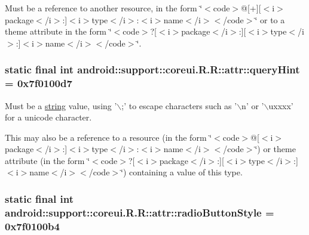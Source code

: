 Must be a reference to another resource, in the form \char`\"{}$<$code$>$@\mbox{[}+\mbox{]}\mbox{[}$<$i$>$package$<$/i$>$:\mbox{]}$<$i$>$type$<$/i$>$:$<$i$>$name$<$/i$>$$<$/code$>$\char`\"{} or to a theme attribute in the form \char`\"{}$<$code$>$?\mbox{[}$<$i$>$package$<$/i$>$:\mbox{]}\mbox{[}$<$i$>$type$<$/i$>$:\mbox{]}$<$i$>$name$<$/i$>$$<$/code$>$\char`\"{}. \hypertarget{classandroid_1_1support_1_1coreui_1_1_r_1_1attr_500b3e6d59de87b1352f0607ba444830}{
\subsubsection[{queryHint}]{\setlength{\rightskip}{0pt plus 5cm}static final int android::support::coreui.R.R::attr::queryHint = 0x7f0100d7}}
\label{classandroid_1_1support_1_1coreui_1_1_r_1_1attr_500b3e6d59de87b1352f0607ba444830}


Must be a \hyperlink{classandroid_1_1support_1_1coreui_1_1_r_1_1string}{string} value, using '$\backslash$;' to escape characters such as '$\backslash$n' or '$\backslash$uxxxx' for a unicode character. 

This may also be a reference to a resource (in the form \char`\"{}$<$code$>$@\mbox{[}$<$i$>$package$<$/i$>$:\mbox{]}$<$i$>$type$<$/i$>$:$<$i$>$name$<$/i$>$$<$/code$>$\char`\"{}) or theme attribute (in the form \char`\"{}$<$code$>$?\mbox{[}$<$i$>$package$<$/i$>$:\mbox{]}\mbox{[}$<$i$>$type$<$/i$>$:\mbox{]}$<$i$>$name$<$/i$>$$<$/code$>$\char`\"{}) containing a value of this type. \hypertarget{classandroid_1_1support_1_1coreui_1_1_r_1_1attr_2419de2fe2b9f1de9232cb340e4e58c1}{
\subsubsection[{radioButtonStyle}]{\setlength{\rightskip}{0pt plus 5cm}static final int android::support::coreui.R.R::attr::radioButtonStyle = 0x7f0100b4}}
\label{classandroid_1_1support_1_1coreui_1_1_r_1_1attr_2419de2fe2b9f1de9232cb340e4e58c1}


